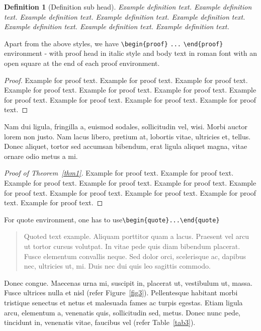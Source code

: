 \documentclass[numbers,webpdf]{ima-authoring-template}%
\theoremstyle{thmstyletwo}%
\newtheorem{definition}{Definition}
\numberwithin{equation}{section}
\begin{document}
\begin{definition}[Definition sub head]
Example definition text. Example definition text. Example definition text. Example definition text. Example definition text. Example definition text. Example definition text. Example definition text.
\end{definition}

Apart from the above styles, we have \verb+\begin{proof}+ \verb+...+ \verb+\end{proof}+ environment - with proof head in italic style and body text in roman font with an open square at the end of each proof environment.

\begin{proof}Example for proof text. Example for proof text. Example for proof text. Example for proof text. Example for proof text. Example for proof text. Example for proof text. Example for proof text. Example for proof text. Example for proof text.
\end{proof}

Nam dui ligula, fringilla a, euismod sodales, sollicitudin vel, wisi. Morbi auctor lorem non justo. Nam lacus libero,
pretium at, lobortis vitae, ultricies et, tellus. Donec aliquet, tortor sed accumsan bibendum, erat ligula aliquet magna,
vitae ornare odio metus a mi.

\begin{proof}[Proof of Theorem~{\upshape\ref{thm1}}]
Example for proof text. Example for proof text. Example for proof text. Example for proof text. Example for proof text. Example for proof text. Example for proof text. Example for proof text. Example for proof text. Example for proof text.
\end{proof}

\noindent
For quote environment, one has to use\newline \verb+\begin{quote}...\end{quote}+
\begin{quote}
Quoted text example. Aliquam porttitor quam a lacus. Praesent vel arcu ut tortor cursus volutpat. In vitae pede quis diam bibendum placerat. Fusce elementum
convallis neque. Sed dolor orci, scelerisque ac, dapibus nec, ultricies ut, mi. Duis nec dui quis leo sagittis commodo.
\end{quote}
Donec congue. Maecenas urna mi, suscipit in, placerat ut, vestibulum ut, massa. Fusce ultrices nulla et nisl (refer Figure~\ref{fig3}). Pellentesque habitant morbi tristique senectus et netus et malesuada fames ac turpis egestas. Etiam ligula arcu,
elementum a, venenatis quis, sollicitudin sed, metus. Donec nunc pede, tincidunt in, venenatis vitae, faucibus vel (refer Table~\ref{tab3}).
\end{document}
